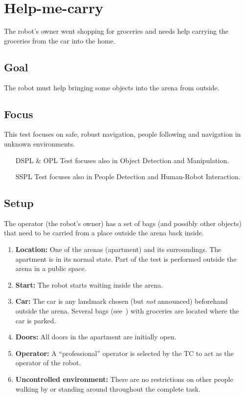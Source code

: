 \section{Help-me-carry}
The robot's owner went shopping for groceries and needs help carrying the groceries from the car into the home.

\subsection{Goal}
The robot must help bringing some objects into the arena from outside.

\subsection{Focus}
This test focuses on safe, robust navigation, people following and navigation in unknown environments.

\begin{itemize}[leftmargin=3cm]
  \item[DSPL \& OPL] Test focuses also in Object Detection and Manipulation.
  \item[SSPL] Test focuses also in People Detection and Human-Robot Interaction.
\end{itemize}

\subsection{Setup}
The operator (the robot's owner) has a set of bags (and possibly other objects) that need to be carried from a place outside the arena back inside.

\begin{enumerate}
  \item \textbf{Location:} One of the arenas (apartment) and its surroundings. The apartment is in its normal state. Part of the test is performed outside the arena in a public space.
  \item \textbf{Start:} The robot starts waiting inside the arena.
  \item \textbf{Car:} The car is any landmark chosen (but \emph{not} announced) beforehand outside the arena. Several bags (see~) with groceries are located where the car is parked.
  \item \textbf{Doors:} All doors in the apartment are initially open.
  \item \textbf{Operator:} A \enquote{professional} operator is selected by the TC to act as the operator of the robot.
  \item \textbf{Uncontrolled environment:} There are no restrictions on other people walking by or standing around throughout the complete task.
\end{enumerate}

